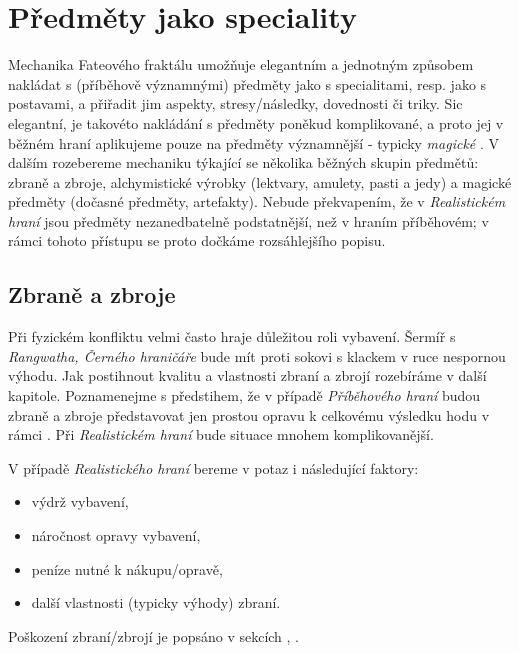 \documentclass[../main.tex]{subfiles}
\begin{document}
\chapter{Předměty jako speciality}
\label{chap:magicke-spec-predmety}

Mechanika Fateového fraktálu  umožňuje elegantním a jednotným způsobem nakládat s (příběhově významnými) předměty jako s specialitami, resp. jako s postavami, a přiřadit jim aspekty, stresy/následky, dovednosti či triky. Sic elegantní, je takovéto nakládání s předměty poněkud komplikované, a proto jej v běžném hraní aplikujeme pouze na předměty významnější - typicky \emph{magické} . V dalším rozebereme mechaniku týkající se několika běžných skupin předmětů: zbraně a zbroje, alchymistické výrobky (lektvary, amulety, pasti a jedy) a magické předměty (dočasné předměty, artefakty). Nebude překvapením, že v \emph{Realistickém hraní} jsou předměty nezanedbatelně podstatnější, než v hraním příběhovém; v rámci tohoto přístupu se proto dočkáme rozsáhlejšího popisu.

\section{Zbraně a zbroje}
\label{sec:zbrane-zbroje}

Při fyzickém konfliktu  velmi často hraje důležitou roli vybavení. Šermíř s   \emph{Rangwatha, Černého hraničáře} bude mít proti sokovi s klackem v ruce nespornou výhodu. Jak postihnout kvalitu a vlastnosti zbraní a zbrojí rozebíráme v další kapitole. Poznamenejme s předstihem, že v případě \emph{Příběhového hraní} budou zbraně a zbroje představovat jen prostou opravu k celkovému výsledku hodu v rámci . Při  \emph{Realistickém hraní} bude situace mnohem komplikovanější.

\begin{Real}
	V případě \emph{Realistického hraní} bereme v potaz i následující faktory:
	\begin{itemize}
		\item výdrž vybavení,
		\item náročnost opravy vybavení,
		\item peníze nutné k nákupu/opravě,
		\item další vlastnosti (typicky výhody) zbraní.
	\end{itemize}
	Poškození zbraní/zbrojí je popsáno v sekcích , .
\end{Real}
\end{document}
